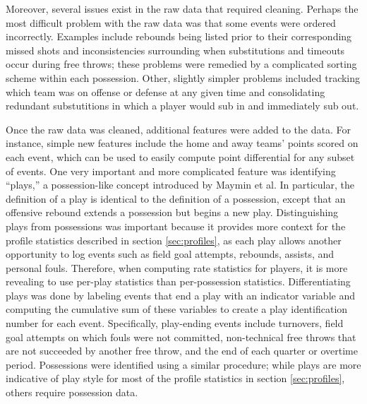 Moreover, several issues exist in the raw data that required cleaning. Perhaps the
most difficult problem with the raw data was that some events were ordered
incorrectly. Examples include rebounds being listed prior to their corresponding
missed shots and inconsistencies surrounding when substitutions and timeouts occur
during free throws; these problems were remedied by a complicated sorting scheme
within each possession. Other, slightly simpler problems included tracking which
team was on offense or defense at any given time and consolidating redundant
substutitions in which a player would sub in and immediately sub out.

Once the raw data was cleaned, additional features were added to the data. For
instance, simple new features include the home and away teams' points scored on
each event, which can be used to easily compute point differential for any
subset of events. One very important and more complicated feature was
identifying ``plays,'' a possession-like concept introduced by Maymin et al. In
particular, the definition of a play is identical to the definition of a
possession, except that an offensive rebound extends a possession but begins a
new play. Distinguishing plays from possessions was important because it
provides more context for the profile statistics described in section
\ref{sec:profiles}, as each play allows another opportunity to log events such
as field goal attempts, rebounds, assists, and personal fouls.  Therefore, when
computing rate statistics for players, it is more revealing to use per-play
statistics than per-possession statistics. Differentiating plays was done by
labeling events that end a play with an indicator variable and computing the
cumulative sum of these variables to create a play identification number for
each event. Specifically, play-ending events include turnovers, field goal
attempts on which fouls were not committed, non-technical free throws that are
not succeeded by another free throw, and the end of each quarter or overtime
period. Possessions were identified using a similar procedure; while plays are
more indicative of play style for most of the profile statistics in section
\ref{sec:profiles}, others require possession data.

